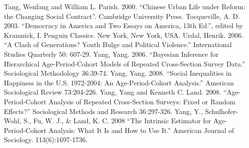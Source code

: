 Tang, Wenfang and William L. Parish. 2000. “Chinese Urban Life under Reform: the Changing Social Contract”. Cambridge University Press.
Tocqueville, A. D. 2003. “Democracy in America and Two Essays on America, 13th Ed.”, edited by Kramnick, I. Penguin Classics. New York, New York, USA.
Urdal, Henrik. 2006. “A Clash of Generations? Youth Bulge and Political Violence.” International Studies Quarterly 50: 607-29.
Yang, Yang. 2006. “Bayesian Inference for Hierarchical Age-Period-Cohort Models of Repeated Cross-Section Survey Data.” Sociological Methodology 36:39-74.
Yang, Yang. 2008. “Social Inequalities in Happiness in the U.S. 1972-2004: An Age-Period-Cohort Analysis.” American Sociological Review 73:204-226.
Yang, Yang and Kenneth C. Land. 2008. “Age-Period-Cohort Analysis of Repeated Cross-Section Surveys: Fixed or Random Effects?” Sociological Methods and Research 36:297-326.
Yang, Y., Schulhofer-Wohl, S., Fu, W. J., & Land, K. C. 2008 “The Intrinsic Estimator for Age-Period-Cohort Analysis: What It Is and How to Use It.” American Journal of Sociology. 113(6):1697-1736.

